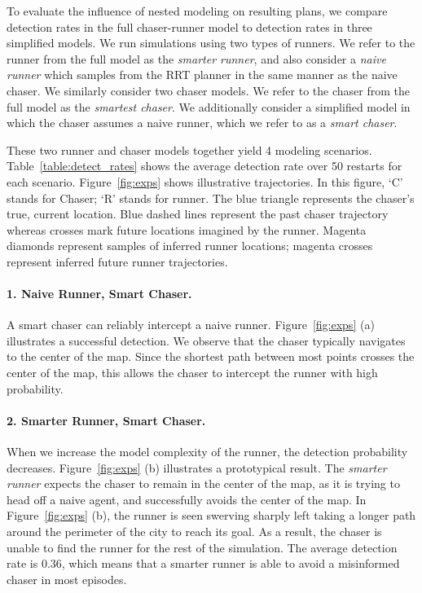 \documentclass{article}
\begin{document}
To evaluate the influence of nested modeling on resulting plans, we compare detection rates in the full chaser-runner model to detection rates in three simplified models. We run simulations using two types of runners. We refer to the runner from the full model as the \emph{smarter runner}, and also consider a \textit{naive runner} which samples from the RRT planner in the same manner as the naive chaser. We similarly consider two chaser models. We refer to the chaser from the full model as the \emph{smartest chaser}. We additionally consider a simplified model in which the chaser assumes a naive runner, which we refer to as a \emph{smart chaser}. 

These two runner and chaser models together yield 4 modeling scenarios. Table~\ref{table:detect_rates} shows the average detection rate over 50 restarts for each scenario. Figure~\ref{fig:exps} shows illustrative trajectories. In this figure, `C' stands for Chaser; `R' stands for runner.  The blue triangle represents the chaser's true, current location. 
Blue dashed lines represent the past chaser trajectory whereas crosses mark future locations imagined by the runner. 
Magenta diamonds represent samples of inferred runner locations;
magenta crosses represent inferred future runner trajectories.  


\paragraph{1. Naive Runner, Smart Chaser.} A smart chaser can reliably intercept a naive runner. 
Figure~\ref{fig:exps} (a) illustrates a successful detection. We observe that the chaser typically navigates to the center of the map. Since the shortest path between most points crosses the center of the map, this allows the chaser to intercept the runner with high probability.

\paragraph{2. Smarter Runner, Smart Chaser.} When we increase the model complexity of the runner, the detection probability decreases. 
Figure~\ref{fig:exps} (b) illustrates a prototypical result.  The \emph{smarter runner} expects the chaser to remain in the center of the map, as it is trying to head off a naive agent, and successfully avoids the center of the map. In Figure~\ref{fig:exps} (b), the runner is seen swerving sharply left taking a longer path around the perimeter of the city to reach its goal. As a result, the chaser is unable to find the runner for the rest of the simulation. The average detection rate is 0.36, which means that a smarter runner is able to avoid a misinformed chaser in most episodes.
\vspace{-0.25em}
\end{document}
